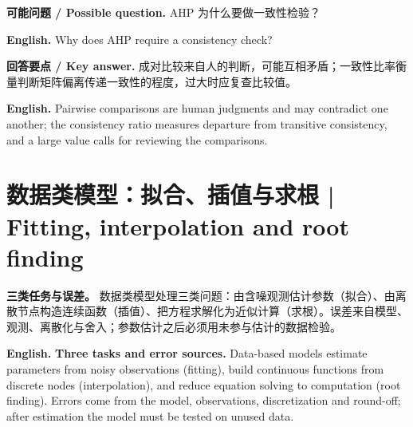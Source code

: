 \documentclass[UTF8,11pt,a4paper]{ctexart}
\newcommand{\EN}[1]{\par\noindent\textbf{English.} #1\par}
\newcommand{\ASK}[4]{\par\noindent\textbf{可能问题 / Possible question.} #1\par\EN{#2}\noindent\textbf{回答要点 / Key answer.} #3\par\EN{#4}\smallskip}
\begin{document}
\ASK{AHP 为什么要做一致性检验？}{Why does AHP require a consistency check?}{成对比较来自人的判断，可能互相矛盾；一致性比率衡量判断矩阵偏离传递一致性的程度，过大时应复查比较值。}{Pairwise comparisons are human judgments and may contradict one another; the consistency ratio measures departure from transitive consistency, and a large value calls for reviewing the comparisons.}

\section{数据类模型：拟合、插值与求根 | Fitting, interpolation and root finding}
\noindent\textbf{三类任务与误差。} 数据类模型处理三类问题：由含噪观测估计参数（拟合）、由离散节点构造连续函数（插值）、把方程求解化为近似计算（求根）。误差来自模型、观测、离散化与舍入；参数估计之后必须用未参与估计的数据检验。
\EN{\textbf{Three tasks and error sources.} Data-based models estimate parameters from noisy observations (fitting), build continuous functions from discrete nodes (interpolation), and reduce equation solving to computation (root finding). Errors come from the model, observations, discretization and round-off; after estimation the model must be tested on unused data.}
\end{document}
